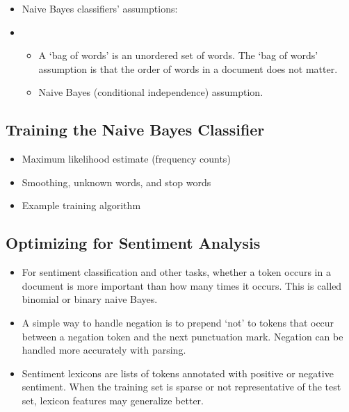\begin{itemize}
\begin{itemize}
\begin{equation}
                \end{equation}
        \end{itemize}
  \item Naive Bayes classifiers' assumptions:
  \item[]
        \begin{itemize}
          \item A `bag of words' is an unordered set of words.
                The `bag of words' assumption is that the order of words in a document does not
                matter.
          \item Naive Bayes (conditional independence) assumption.
        \end{itemize}
\end{itemize}

\subsection{Training the Naive Bayes Classifier}

\begin{itemize}
  \item Maximum likelihood estimate (frequency counts)
  \item Smoothing, unknown words, and stop words
  \item Example training algorithm
\end{itemize}

\setcounter{subsection}{3}
\subsection{Optimizing for Sentiment Analysis}

\begin{itemize}
  \item For sentiment classification and other tasks, whether a token occurs in a document is more important than how many times it occurs.
        This is called binomial or binary naive Bayes.
  \item A simple way to handle negation is to prepend `not' to tokens that occur between a negation token and the next punctuation mark.
        Negation can be handled more accurately with parsing.
  \item Sentiment lexicons are lists of tokens annotated with positive or negative sentiment.
        When the training set is sparse or not representative of the test set, lexicon
        features may generalize better.
\end{itemize}

